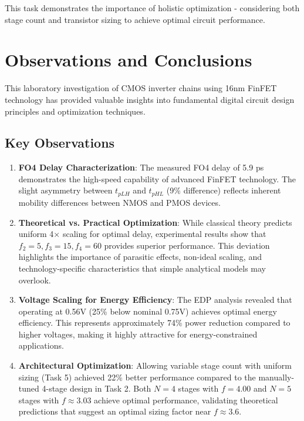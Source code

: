 \documentclass[UTF8,12pt,a4paper]{ctexart}
\begin{document}
This task demonstrates the importance of holistic optimization - considering both stage count and transistor sizing to achieve optimal circuit performance.

\newpage
\section{Observations and Conclusions}

This laboratory investigation of CMOS inverter chains using 16nm FinFET technology has provided valuable insights into fundamental digital circuit design principles and optimization techniques.

\subsection{Key Observations}

\begin{enumerate}
    \item \textbf{FO4 Delay Characterization}: The measured FO4 delay of 5.9 ps demonstrates the high-speed capability of advanced FinFET technology. The slight asymmetry between $t_{pLH}$ and $t_{pHL}$ (9\% difference) reflects inherent mobility differences between NMOS and PMOS devices.

    \item \textbf{Theoretical vs. Practical Optimization}: While classical theory predicts uniform 4× scaling for optimal delay, experimental results show that $f_2=5, f_3=15, f_4=60$ provides superior performance. This deviation highlights the importance of parasitic effects, non-ideal scaling, and technology-specific characteristics that simple analytical models may overlook.
    
    \item \textbf{Voltage Scaling for Energy Efficiency}: The EDP analysis revealed that operating at 0.56V (25\% below nominal 0.75V) achieves optimal energy efficiency. This represents approximately 74\% power reduction compared to higher voltages, making it highly attractive for energy-constrained applications.
    
    \item \textbf{Architectural Optimization}: Allowing variable stage count with uniform sizing (Task 5) achieved 22\% better performance compared to the manually-tuned 4-stage design in Task 2. Both $N=4$ stages with $f = 4.00$ and $N=5$ stages with $f \approx 3.03$ achieve optimal performance, validating theoretical predictions that suggest an optimal sizing factor near $f \approx 3.6$.
\end{enumerate}
\end{document}
